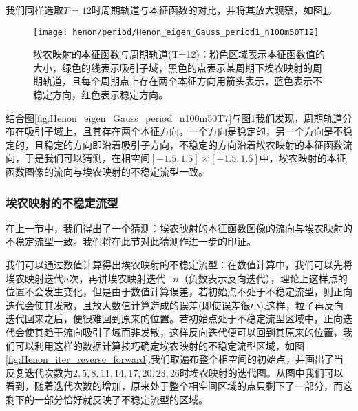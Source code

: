 我们同样选取$T=12$时周期轨道与本征函数的对比，并将其放大观察，如图\ref{fig:Henon_eigen_Gauss_period1_n100m50T12}。
\begin{figure}
	\centering
	\texttt{[image: henon/period/Henon\_eigen\_Gauss\_period1\_n100m50T12]}
    \caption[埃农映射的本征函数与周期轨道]{埃农映射的本征函数与周期轨道(T=12)：粉色区域表示本征函数值的大小，绿色的线表示吸引子域，黑色的点表示某周期下埃农映射的周期轨道，且每个周期点上存在两个本征方向用箭头表示，蓝色表示不稳定方向，红色表示稳定方向。}\label{fig:Henon_eigen_Gauss_period1_n100m50T12}
\end{figure}
结合图\ref{fig:Henon_eigen_Gauss_period_n100m50T7}与图\ref{fig:Henon_eigen_Gauss_period1_n100m50T12}我们发现，周期轨道分布在吸引子域上，且其存在两个本征方向，一个方向是稳定的，另一个方向是不稳定的，且稳定的方向即沿着吸引子方向，不稳定的方向沿着埃农映射的本征函数流向，于是我们可以猜测，在相空间$[-1.5,1.5]\times [-1.5,1.5]$中，埃农映射的本征函数图像的流向与埃农映射的不稳定流型一致。

\subsubsection{埃农映射的不稳定流型}
在上一节中，我们得出了一个猜测：埃农映射的本征函数图像的流向与埃农映射的不稳定流型一致。我们将在此节对此猜测作进一步的印证。

我们可以通过数值计算得出埃农映射的不稳定流型：在数值计算中，我们可以先将埃农映射迭代$n$次，再讲埃农映射迭代$-n$（负数表示反向迭代），理论上这样点的位置不会发生变化，但是由于数值计算误差，若初始点不处于不稳定流型，则正向迭代会使其发散，且放大数值计算造成的误差(即使误差很小),这样，粒子再反向迭代回来之后，便很难回到原来的位置。若初始点处于不稳定流型区域中，正向迭代会使其趋于流向吸引子域而非发散，这样反向迭代便可以回到其原来的位置，我们可以利用这样的数据计算技巧确定埃农映射的不稳定流型区域，如图\ref{fig:Henon_iter_reverse_forward},我们取遍布整个相空间的初始点，并画出了当反复迭代次数为$2,5,8,11,14,17,20,23,26$时埃农映射的迭代图。从图中我们可以看到，随着迭代次数的增加，原来处于整个相空间区域的点只剩下了一部分，而这剩下的一部分恰好就反映了不稳定流型的区域。

